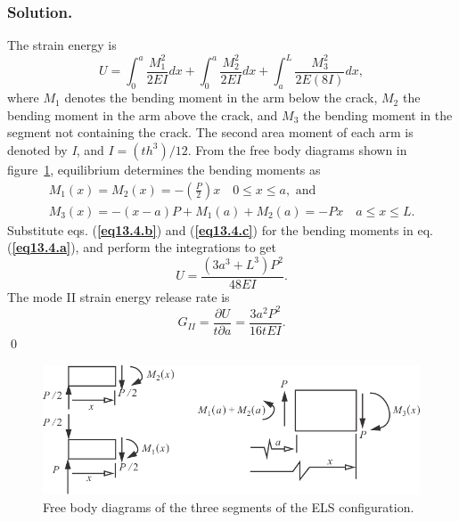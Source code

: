 \documentclass{AeroStructure-ERJohnson}
\begin{document}
\begin{example*}
\subsubsection{Solution.} The strain energy is
\begin{equation}
U=\int_{0}^{a} \frac{M_{1}^{2}}{2 E I} d x+\int_{0}^{a} \frac{M_{2}^{2}}{2 E I} d x+\int_{a}^{L} \frac{M_{3}^{2}}{2 E(8 I)} d x, \label{eq13.4.a}\tag{a}
\end{equation}
where $\textit{M}_1$ denotes the bending moment in the arm below the crack, $\textit{M}_2$ the bending moment in the arm above the crack, and $\textit{M}_3$ the bending moment in the segment not containing the crack. The second area moment of\vadjust{\vspace*{6pt}\pagebreak} each arm is denoted by \textit{I}, and $I=\left(t h^{3}\right)/12$. From the free body diagrams shown in figure~\ref{fig13.18}, equilibrium determines the bending moments as
\begin{gather}
M_{1}(x)=M_{2}(x)=-\left(\frac{P}{2}\right) x \quad 0 \leq x \leq a, \textrm{ and} \label{eq13.4.b}\tag{b}\\
M_{3}(x)=-(x-a) P+M_{1}(a)+M_{2}(a)=-P x \quad a \leq x \leq L.  \label{eq13.4.c}\tag{c}
\end{gather}
Substitute eqs. (\textbf{\ref{eq13.4.b}}) and (\textbf{\ref{eq13.4.c}}) for the bending moments in eq. (\textbf{\ref{eq13.4.a}}), and perform the integrations to get
\begin{equation}
U=\frac{(3 a^{3}+L^{3})P^{2}}{48 E I}. \label{eq13.4.d}\tag{d}
\end{equation}
The mode II strain energy release rate is
\begin{equation}
G_{II}=\frac{\partial U}{t \partial a}=\frac{3 a^{2} P^{2}}{16 t E I}.\label{eq13.4.e}\tag{e}
\end{equation}\hfill\qed
\end{example*}

\begin{figure}[!t]
\centerline{\includegraphics{Figure_13-18.pdf}}
\caption{Free body diagrams of the three segments of the ELS configuration.}\label{fig13.18}
\end{figure}
\end{document}
